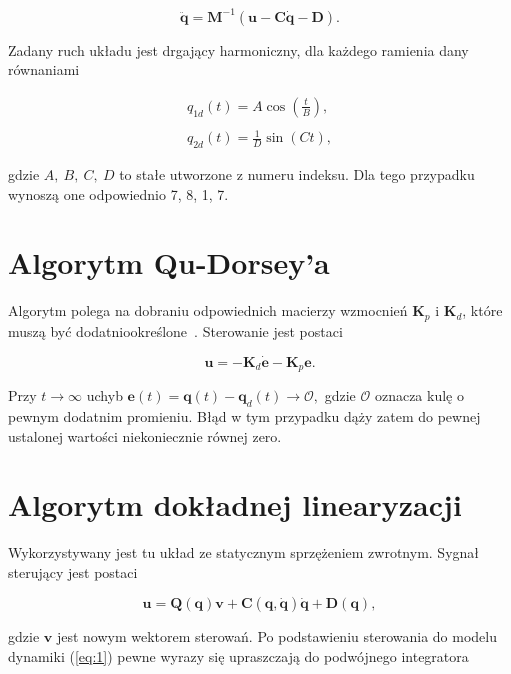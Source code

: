 \documentclass[12pt,a4paper]{article}
\newcommand{\mb}[1]{\mathbf{#1}}
\begin{document}
\begin{equation}
\mb{\ddot{q}} = \mathbf{M}^{-1}(\mb{u}-\mathbf{C\dot{q}}-\mathbf{D}).\label{eq:ddotq}
\end{equation}

Zadany ruch układu jest drgający harmoniczny, dla każdego ramienia dany równaniami

\begin{equation}
\begin{matrix} 
q_{1d}(t) = A\cos\left(\frac{t}{B}\right),\\\\ \label{eq:traj}
q_{2d}(t) = \frac{1}{D}\sin(Ct),\end{matrix}
\end{equation}

gdzie $A,~B,~C,~D$ to stałe utworzone z numeru indeksu. Dla tego przypadku wynoszą one odpowiednio 7, 8, 1, 7.

\section{Algorytm Qu-Dorsey'a}

Algorytm polega na dobraniu odpowiednich macierzy wzmocnień $\mb{K}_p$ i $\mb{K}_d$, które muszą być dodatniookreślone~\cite{Tchon::MAN}. Sterowanie jest postaci

\begin{equation}
\mb{u} = -\mb{K}_d\dot{\mb{e}} - \mb{K}_p\mb{e}.\label{eq:qudorsey}
\end{equation}

Przy $t \rightarrow \infty$ uchyb $\mb{e}(t) = \mb{q}(t) - \mb{q}_d(t) \rightarrow \mathscr{O},$ gdzie $\mathscr{O}$ oznacza kulę o pewnym dodatnim promieniu. Błąd w tym przypadku dąży zatem do pewnej ustalonej wartości niekoniecznie równej zero. 

\section{Algorytm dokładnej linearyzacji}

Wykorzystywany jest tu układ ze statycznym sprzężeniem zwrotnym. Sygnał sterujący jest postaci

\begin{equation}
    \mb{u} = \mb{Q}(\mb{q})\mb{v} + \mb{C}(\mb{q},\dot{\mb{q}})\dot{\mb{q}} + \mb{D}(\mb{q}),
\end{equation}

gdzie $\mb{v}$ jest nowym wektorem sterowań. Po podstawieniu sterowania do modelu dynamiki (\ref{eq:1}) pewne wyrazy się upraszczają do podwójnego integratora
\end{document}
